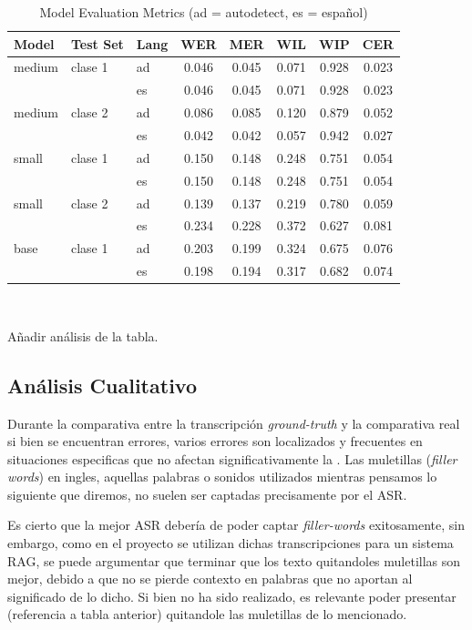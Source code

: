 \begin{table}[htbp]
\centering
\caption{Model Evaluation Metrics (ad = autodetect, es = español)}
\begin{tabular}{l l l S[table-format=1.3] S[table-format=1.3] S[table-format=1.3] S[table-format=1.3] S[table-format=1.3]}
\toprule
\textbf{Model} & \textbf{Test Set} & \textbf{Lang} & \textbf{WER} & \textbf{MER} & \textbf{WIL} & \textbf{WIP} & \textbf{CER} \\
\midrule
medium & clase 1 & ad & 0.046 & 0.045 & 0.071 & 0.928 & 0.023 \\
       &               & es & 0.046 & 0.045 & 0.071 & 0.928 & 0.023 \\
\cmidrule(r){1-8}
medium & clase 2 & ad & 0.086 & 0.085 & 0.120 & 0.879 & 0.052 \\
       &               & es & 0.042 & 0.042 & 0.057 & 0.942 & 0.027 \\
\midrule
small  & clase 1 & ad & 0.150 & 0.148 & 0.248 & 0.751 & 0.054 \\
       &               & es & 0.150 & 0.148 & 0.248 & 0.751 & 0.054 \\
\cmidrule(r){1-8}
small  & clase 2 & ad & 0.139 & 0.137 & 0.219 & 0.780 & 0.059 \\
       &               & es & 0.234 & 0.228 & 0.372 & 0.627 & 0.081 \\
\midrule
base   & clase 1 & ad & 0.203 & 0.199 & 0.324 & 0.675 & 0.076 \\
       &               & es & 0.198 & 0.194 & 0.317 & 0.682 & 0.074 \\
\bottomrule
\end{tabular}
\
\end{table}
Añadir análisis de la tabla.
\subsection{Análisis Cualitativo}
\label{subsection:6-1-análisis Cualitativo}

Durante la comparativa entre la transcripción \textit{ground-truth} y la comparativa real si bien se encuentran errores, varios errores son localizados y frecuentes en situaciones especificas que no afectan significativamente la .
Las muletillas (\textit{filler words}) en ingles, aquellas palabras o sonidos utilizados mientras pensamos lo siguiente que diremos, no suelen ser captadas precisamente por el ASR. 

Es cierto que la mejor ASR debería de poder captar \textit{filler-words} exitosamente, sin embargo, como en el proyecto se utilizan dichas transcripciones para un sistema RAG, se puede argumentar que terminar que los texto quitandoles muletillas son mejor, debido a que no se pierde contexto en palabras que no aportan al significado de lo dicho. Si bien no ha sido realizado, es relevante poder presentar (referencia a tabla anterior) quitandole las muletillas de lo mencionado. 
